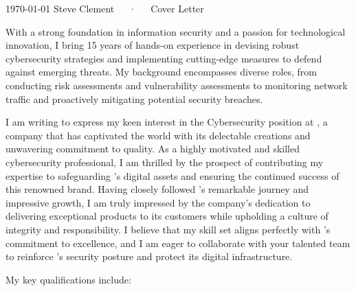 \documentclass[11pt, a4paper]{awesome-cv}
\begin{document}
\makecvheader[R]

\makecvfooter
  {\today}
  {Steve Clement~~~·~~~Cover Letter}
  {}

\makelettertitle

\begin{cvletter}





With a strong foundation in information security and a passion for technological innovation, I bring 15 years of hands-on experience in devising robust cybersecurity strategies and implementing cutting-edge measures to defend against emerging threats. My background encompasses diverse roles, from conducting risk assessments and vulnerability assessments to monitoring network traffic and proactively mitigating potential security breaches.

I am writing to express my keen interest in the Cybersecurity position at , a company that has captivated the world with its delectable  creations and unwavering commitment to quality. As a highly motivated and skilled cybersecurity professional, I am thrilled by the prospect of contributing my expertise to safeguarding 's digital assets and ensuring the continued success of this renowned brand.
Having closely followed 's remarkable journey and impressive growth, I am truly impressed by the company's dedication to delivering exceptional products to its customers while upholding a culture of integrity and responsibility. I believe that my skill set aligns perfectly with 's commitment to excellence, and I am eager to collaborate with your talented team to reinforce 's security posture and protect its digital infrastructure.

My key qualifications include:


\end{cvletter}
\end{document}

